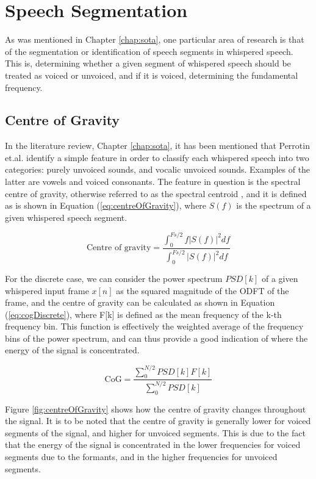 \section{Speech Segmentation}

As was mentioned in Chapter \ref{chap:sota}, one particular area of research is that of the segmentation or identification of speech segments in whispered speech. This is, determining whether a given segment of whispered speech should be treated as voiced or unvoiced, and if it is voiced, determining the fundamental frequency. 

\subsection{Centre of Gravity}

In the literature review, Chapter \ref{chap:sota}, it has been mentioned that Perrotin et.al. \cite{perrotinGlottalFlowSynthesis2020} identify a simple feature in order to classify each whispered speech into two categories: purely unvoiced sounds, and vocalic unvoiced sounds. Examples of the latter are vowels and voiced consonants. The feature in question is the spectral centre of gravity, otherwise referred to as the spectral centroid \cite{peetersLargeSetAudio2004}, and it is defined as is shown in Equation (\ref{eq:centreOfGravity}), where $S(f)$ is the spectrum of a given whispered speech segment.

\begin{equation}
    \text{Centre of gravity} = \frac{\int_{0}^{Fs/2}f |S(f)|^2 df}{\int_{0}^{Fs/2}|S(f)|^2 df}
    \label{eq:centreOfGravity}
\end{equation}

For the discrete case, we can consider the power spectrum $PSD[k]$ of a given whispered input frame $x[n]$ as the squared magnitude of the ODFT of the frame, and the centre of gravity can be calculated as shown in Equation (\ref{eq:cogDiscrete}), where F[k] is defined as the mean frequency of the k-th frequency bin. This function is effectively the weighted average of the frequency bins of the power spectrum, and can thus provide a good indication of where the energy of the signal is concentrated.

\begin{equation}
    \text{CoG} = \frac{\sum_{0}^{N/2}PSD[k]F[k]}{\sum_{0}^{N/2}PSD[k]}
    \label{eq:cogDiscrete}
\end{equation}

Figure \ref{fig:centreOfGravity} shows how the centre of gravity changes throughout the signal. It is to be noted that the centre of gravity is generally lower for voiced segments of the signal, and higher for unvoiced segments. This is due to the fact that the energy of the signal is concentrated in the lower frequencies for voiced segments due to the formants, and in the higher frequencies for unvoiced segments.

